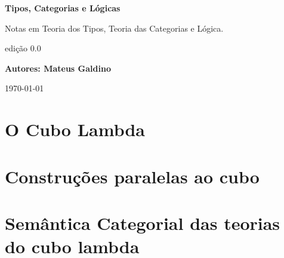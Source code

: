 \documentclass[a4paper]{article}
\theoremstyle{definition}
\begin{document}
    \begin{titlepage}
        \begin{center}
            \vspace*{1cm}
    
            \Huge
            \textbf{Tipos, Categorias e Lógicas}
    
            \vspace{0.5cm}
            \large
            Notas em Teoria dos Tipos, Teoria das Categorias e Lógica.
                  
            \vfill



            \Large
            edição \textbf{$0.0$}

            \textbf{Autores: Mateus Galdino}

            \today
                
        \end{center}
    \end{titlepage}

    \begingroup
        \hypersetup{hidelinks}    
        \tableofcontents

    \endgroup


    \newpage

        

    \newpage


        \part{O Cubo Lambda}
            \setcounter{section}{0}
            \renewcommand*{\theHsection}{chX.\the\value{section}}

            
            \newpage
            
            \newpage
            
            \newpage
            

    \newpage

        \part{Construções paralelas ao cubo}

    \newpage

        \part{Semântica Categorial das teorias do cubo lambda}
            \setcounter{section}{0}
            \renewcommand*{\theHsection}{chX.\the\value{section}}
\end{document}
